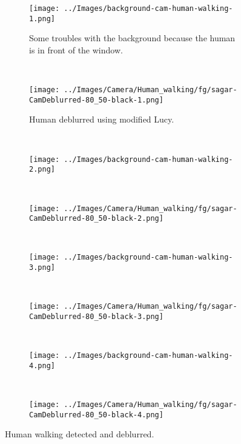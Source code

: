 \begin{figure}[h]
\centering
\begin{subfigure}{0.4\textwidth}
\texttt{[image: ../Images/background-cam-human-walking-1.png]}
\caption{Some troubles with the background because the human is in front of the window.}
\label{fig:DetectHuman1}
\end{subfigure}
~
\begin{subfigure}{0.4\textwidth}
\texttt{[image: ../Images/Camera/Human\_walking/fg/sagar-CamDeblurred-80\_50-black-1.png]}
\caption{Human deblurred using modified Lucy.}
\label{fig:HumanDeblurred1}
\end{subfigure}
~
\begin{subfigure}{0.4\textwidth}
\texttt{[image: ../Images/background-cam-human-walking-2.png]}
\end{subfigure}
~
\begin{subfigure}{0.4\textwidth}
\texttt{[image: ../Images/Camera/Human\_walking/fg/sagar-CamDeblurred-80\_50-black-2.png]}
\end{subfigure}
~
\begin{subfigure}{0.4\textwidth}
\texttt{[image: ../Images/background-cam-human-walking-3.png]}
\end{subfigure}
~
\begin{subfigure}{0.4\textwidth}
\texttt{[image: ../Images/Camera/Human\_walking/fg/sagar-CamDeblurred-80\_50-black-3.png]}
\end{subfigure}
~
\begin{subfigure}{0.4\textwidth}
\texttt{[image: ../Images/background-cam-human-walking-4.png]}
\end{subfigure}
~
\begin{subfigure}{0.4\textwidth}
\texttt{[image: ../Images/Camera/Human\_walking/fg/sagar-CamDeblurred-80\_50-black-4.png]}
\end{subfigure}
\caption{Human walking detected and deblurred.}
\label{fig:DetectHuman}
\end{figure}